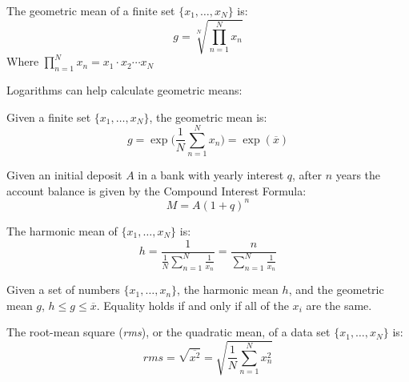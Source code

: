 \documentclass[crop=false,class=article,oneside]{standalone}
\begin{document}
        \begin{definition}
            The geometric mean of a finite set
            $\{x_{1},\hdots,x_{N}\}$ is:
            \begin{equation*}
                g=\sqrt[N]{\prod_{n=1}^{N}x_{n}}
            \end{equation*}
            Where
            $\prod_{n=1}^{N}x_{n}=x_{1}\cdot{x_{2}}\cdots{x_{N}}$
        \end{definition}
        Logarithms can help calculate geometric means:
        \begin{theorem}
            Given a finite set $\{x_{1},\hdots,x_{N}\}$,
            the geometric mean is:
            \begin{equation*}
                g=\exp\Big(\frac{1}{N}\sum_{n=1}^{N}x_{n}\Big)
                =\exp(\overline{x})
            \end{equation*}
        \end{theorem}
        Given an initial deposit $A$ in a bank with yearly interest $q$,
        after $n$ years the account balance is given by the
        Compound Interest Formula:
        \begin{equation*}
            M=A(1+q)^{n}
        \end{equation*}
        \begin{definition}
            The harmonic mean of $\{x_{1},\hdots,x_{N}\}$
            is:
            \begin{equation*}
                h=\frac{1}{\frac{1}{N}\sum_{n=1}^{N}\frac{1}{x_{n}}}
                =\frac{n}{\sum_{n=1}^{N}\frac{1}{x_{n}}}
            \end{equation*}
        \end{definition}
        \begin{theorem}
            Given a set of numbers $\{x_{1},\hdots,x_{n}\}$,
            the harmonic mean $h$, and the geometric mean $g$,
            $h\leq{g}\leq\overline{x}$. Equality holds if
            and only if all of the $x_{i}$ are the same.
        \end{theorem}
        \begin{definition}
            The root-mean square (\textit{rms}), or the
            quadratic mean, of a data set $\{x_{1},\hdots,x_{N}\}$
            is:
            \begin{equation*}
                rms=\sqrt{\overline{x^{2}}}
                =\sqrt{\frac{1}{N}\sum_{n=1}^{N}x_{n}^2}
            \end{equation*}
        \end{definition}
\end{document}
